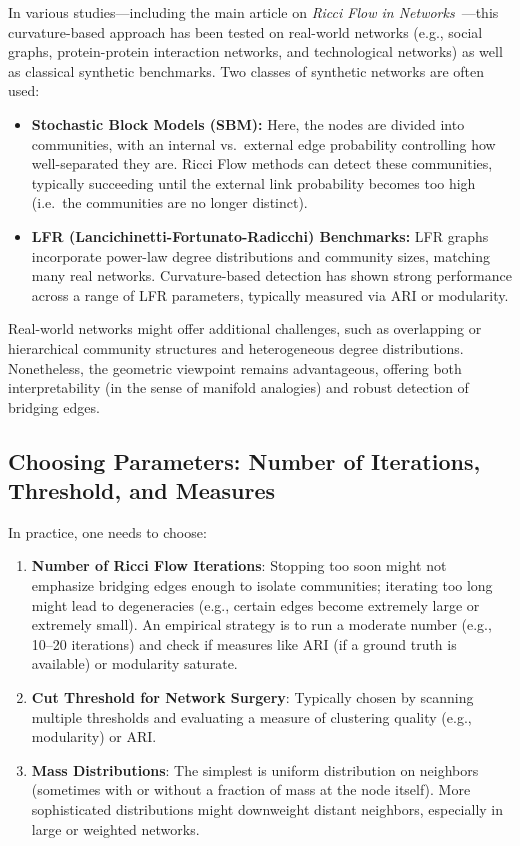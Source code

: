 In various studies---including the main article on \emph{Ricci Flow in Networks}~\cite{Ni:communitydetectionnetworksricci}---this curvature-based approach has been tested on real-world networks (e.g., social graphs, protein-protein interaction networks, and technological networks) as well as classical synthetic benchmarks. Two classes of synthetic networks are often used:
\begin{itemize}
    \item \textbf{Stochastic Block Models (SBM):} Here, the nodes are divided into communities, with an internal vs.\ external edge probability controlling how well-separated they are. Ricci Flow methods can detect these communities, typically succeeding until the external link probability becomes too high (i.e.\ the communities are no longer distinct).
    \item \textbf{LFR (Lancichinetti-Fortunato-Radicchi) Benchmarks:} LFR graphs incorporate power-law degree distributions and community sizes, matching many real networks. Curvature-based detection has shown strong performance across a range of LFR parameters, typically measured via ARI or modularity.
\end{itemize}
Real-world networks might offer additional challenges, such as overlapping or hierarchical community structures and heterogeneous degree distributions. Nonetheless, the geometric viewpoint remains advantageous, offering both interpretability (in the sense of manifold analogies) and robust detection of bridging edges.

\subsection{Choosing Parameters: Number of Iterations, Threshold, and Measures}
\label{subsec:choosing_params}

In practice, one needs to choose:
\begin{enumerate}
    \item \textbf{Number of Ricci Flow Iterations}: Stopping too soon might not emphasize bridging edges enough to isolate communities; iterating too long might lead to degeneracies (e.g., certain edges become extremely large or extremely small). An empirical strategy is to run a moderate number (e.g., 10--20 iterations) and check if measures like ARI (if a ground truth is available) or modularity saturate.
    \item \textbf{Cut Threshold for Network Surgery}: Typically chosen by scanning multiple thresholds and evaluating a measure of clustering quality (e.g., modularity) or ARI. 
    \item \textbf{Mass Distributions}: The simplest is uniform distribution on neighbors (sometimes with or without a fraction of mass at the node itself). More sophisticated distributions might downweight distant neighbors, especially in large or weighted networks.
\end{enumerate}

